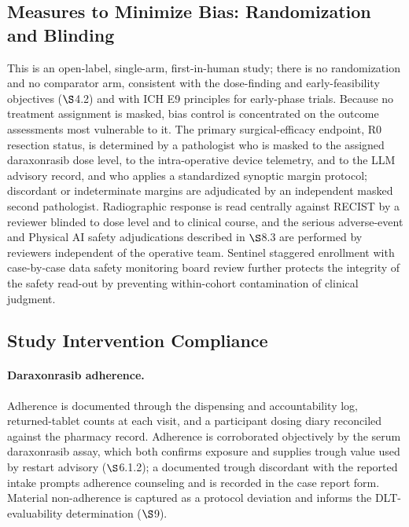\subsection{Measures to Minimize Bias: Randomization and Blinding}

This is an open-label, single-arm, first-in-human study; there is no randomization
and no comparator arm, consistent with the dose-finding and early-feasibility
objectives ($\S$4.2) and with ICH E9 principles for early-phase trials. Because no
treatment assignment is masked, bias control is concentrated on the outcome
assessments most vulnerable to it. The primary surgical-efficacy endpoint, R0
resection status, is determined by a pathologist who is masked to the assigned
daraxonrasib dose level, to the intra-operative device telemetry, and to the
LLM advisory record, and who applies a standardized synoptic margin protocol;
discordant or indeterminate margins are adjudicated by an independent masked
second pathologist. Radiographic response is read centrally against RECIST by a
reviewer blinded to dose level and to clinical course, and the serious
adverse-event and Physical AI safety adjudications described in $\S$8.3 are
performed by reviewers independent of the operative team. Sentinel staggered
enrollment with case-by-case data safety monitoring board review further protects
the integrity of the safety read-out by preventing within-cohort contamination of
clinical judgment.

\subsection{Study Intervention Compliance}

\paragraph{Daraxonrasib adherence.}
Adherence is documented through the dispensing and accountability log, returned-tablet
counts at each visit, and a participant dosing diary reconciled against the
pharmacy record. Adherence is corroborated objectively by the serum daraxonrasib
assay, which both confirms exposure and supplies trough value used by
restart advisory ($\S$6.1.2); a documented trough discordant with the reported
intake prompts adherence counseling and is recorded in the case report form.
Material non-adherence is captured as a protocol deviation and informs the
DLT-evaluability determination ($\S$9).

